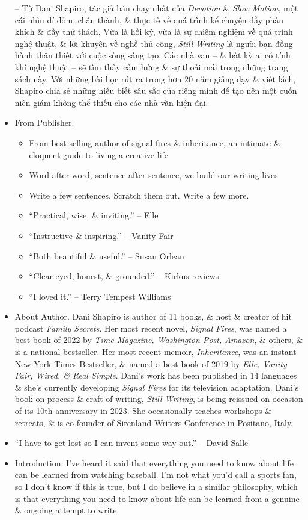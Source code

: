 \documentclass{article}
\begin{document}
\begin{itemize}
	-- Từ {\sc Dani Shapiro}, tác giả bán chạy nhất của {\it Devotion} \& {\it Slow Motion}, một cái nhìn dí dỏm, chân thành, \& thực tế về quá trình kể chuyện đầy phấn khích \& đầy thử thách. Vừa là hồi ký, vừa là sự chiêm nghiệm về quá trình nghệ thuật, \& lời khuyên về nghề thủ công, {\it Still Writing} là người bạn đồng hành thân thiết với cuộc sống sáng tạo. Các nhà văn -- \& bất kỳ ai có tính khí nghệ thuật -- sẽ tìm thấy cảm hứng \& sự thoải mái trong những trang sách này. Với những bài học rút ra trong hơn 20 năm giảng dạy \& viết lách, {\sc Shapiro} chia sẻ những hiểu biết sâu sắc của riêng mình để tạo nên một cuốn niên giám không thể thiếu cho các nhà văn hiện đại.
	\item {\sf From Publisher.}
	\begin{itemize}
		\item From best-selling author of signal fires \& inheritance, an intimate \& eloquent guide to living a creative life
		\item Word after word, sentence after sentence, we build our writing lives
		\item Write a few sentences. Scratch them out. Write a few more.
		\item ``Practical, wise, \& inviting.'' -- Elle
		\item ``Instructive \& inspiring.'' -- Vanity Fair
		\item ``Both beautiful \& useful.'' -- {\sc Susan Orlean}
		\item ``Clear-eyed, honest, \& grounded.'' -- Kirkus reviews
		\item ``I loved it.'' -- {\sc Terry Tempest Williams}
	\end{itemize}
	\item {\sf About Author.} {\sc Dani Shapiro} is author of 11 books, \& host \& creator of hit podcast {\it Family Secrets}. Her most recent novel, {\it Signal Fires}, was named a best book of 2022 by {\it Time Magazine, Washington Post, Amazon}, \& others, \& is a national bestseller. Her most recent memoir, {\it Inheritance}, was an instant New York Times Bestseller, \& named a best book of 2019 by {\it Elle, Vanity Fair, Wired, \& Real Simple}. {\sc Dani}'s work has been published in 14 languages \& she's currently developing {\it Signal Fires} for its television adaptation. {\sc Dani}'s book on process \& craft of writing, {\it Still Writing}, is being reissued on occasion of its 10th anniversary in 2023. She occasionally teaches workshops \& retreats, \& is co-founder of Sirenland Writers Conference in Positano, Italy.
	\item ``I have to get lost so I can invent some way out.'' -- {\sc David Salle}
	\item {\sf Introduction.} I've heard it said that everything you need to know about life can be learned from watching baseball. I'm not what you'd call a sports fan, so I don't know if this is true, but I do believe in a similar philosophy, which is that everything you need to know about life can be learned from a genuine \& ongoing attempt to write.
	

\end{itemize}
\end{document}
